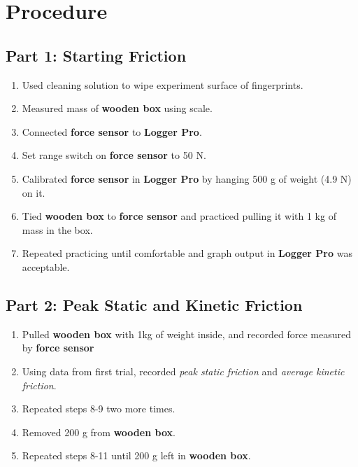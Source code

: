 
\section{Procedure}
\vspace{-0.5cm}
\singlespacing



\subsection{Part 1: Starting Friction}

	\begin{enumerate}
		\item Used cleaning solution to wipe experiment surface of fingerprints.

		\item Measured mass of \textbf{wooden box }using scale.

		\item Connected \textbf{force sensor }to \textbf{Logger Pro}.

		\item Set range switch on \textbf{force sensor} to 50 N.

		\item Calibrated \textbf{force sensor }in \textbf{Logger Pro} by hanging 500
			g of weight (4.9 N) on it.

		\item Tied \textbf{wooden box} to \textbf{force sensor }and practiced
			pulling it with 1 kg of mass in the box.

		\item Repeated practicing until comfortable and graph output in \textbf{Logger
			Pro} was acceptable.
	\end{enumerate}	

\subsection{Part 2: Peak Static and Kinetic Friction}

	\begin{enumerate}[resume]
		\item Pulled \textbf{wooden box }with 1kg of weight inside, and recorded
			force measured by \textbf{force sensor}

		\item Using data from first trial, recorded \emph{peak static friction }and
			\emph{average kinetic friction}.

		\item Repeated steps 8-9 two more times.

		\item Removed 200 g from \textbf{wooden box}.

		\item Repeated steps 8-11 until 200 g left in \textbf{wooden box}.
	\end{enumerate}


